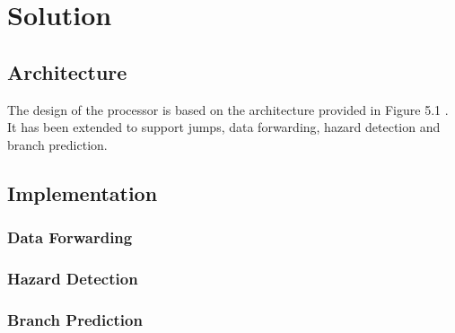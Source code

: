 \section{Solution}


\subsection{Architecture}

The design of the processor is based on the architecture provided in Figure 5.1 \cite[p. 50]{compendium}.
It has been extended to support jumps, data forwarding, hazard detection and branch prediction.

\subsection{Implementation}

\subsubsection{Data Forwarding}

\subsubsection{Hazard Detection}

\subsubsection{Branch Prediction}

